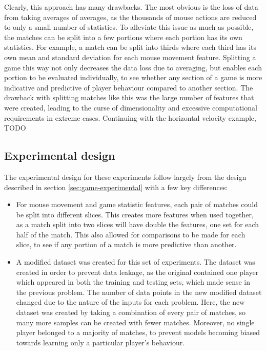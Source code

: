 \documentclass[Report.tex]{subfiles}
\begin{document}
Clearly, this approach has many drawbacks. The most obvious is the loss of data from taking averages of averages, as the thousands of mouse actions are reduced to only a small number of statistics. To alleviate this issue as much as possible, the matches can be split into a few portions where each portion has its own statistics. For example, a match can be split into thirds where each third has its own mean and standard deviation for each mouse movement feature. Splitting a game this way not only decreases the data loss due to averaging, but enables each portion to be evaluated individually, to see whether any section of a game is more indicative and predictive of player behaviour compared to another section. The drawback with splitting matches like this was the large number of features that were created, leading to the curse of dimensionality and excessive computational requirements in extreme cases. Continuing with the horizontal velocity example, TODO

\subsection{Experimental design}
The experimental design for these experiments follow largely from the design described in section \ref{sec:game-experimental} with a few key differences:
\begin{itemize}
\item For mouse movement and game statistic features, each pair of matches could be split into different slices. This creates more features when used together, as a match split into two slices will have double the features, one set for each half of the match. This also allowed for comparisons to be made for each slice, to see if any portion of a match is more predictive than another. 
\item A modified dataset was created for this set of experiments. The dataset was created in order to prevent data leakage, as the original contained one player which appeared in both the training and testing sets, which made sense in the previous problem. The number of data points in the new modified dataset changed due to the nature of the inputs for each problem. Here, the new dataset was created by taking a combination of every pair of matches, so many more samples can be created with fewer matches. Moreover, no single player belonged to a majority of matches, to prevent models becoming biased towards learning only a particular player's behaviour.

\end{itemize}
\end{document}
